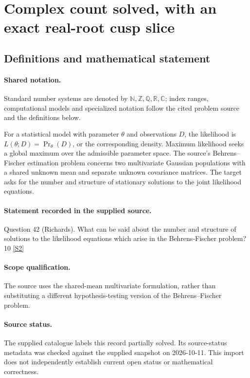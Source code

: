 \documentclass[11pt]{article}
\newcommand{\sref}[2]{\hyperlink{source:#1:#2}{[S#2]}}
\begin{document}
\section{Complex count solved, with an exact real-root cusp slice}\label{statement}

\subsection{Definitions and mathematical statement}

\paragraph{Shared notation.}Standard number systems are denoted by $\mathbb N,\mathbb Z,\mathbb Q,\mathbb R,\mathbb C$; index ranges, computational models and specialized notation follow the cited problem source and the definitions below.


For a statistical model with parameter $\theta$ and observations $D$, the likelihood is $L(\theta;D)=\Pr_\theta(D)$, or the corresponding density. Maximum likelihood seeks a global maximum over the admissible parameter space. The source's Behrens--Fischer estimation problem concerns two multivariate Gaussian populations with a shared unknown mean and separate unknown covariance matrices. The target asks for the number and structure of stationary solutions to the joint likelihood equations.
\paragraph{Statement recorded in the supplied source.}
Question 42 (Richards). What can be said about the number and structure of solutions to the likelihood equations which arise in the Behrens-Fischer problem? 10 \sref{statement}{2}
\paragraph{Scope qualification.}
The source uses the shared-mean multivariate formulation, rather than substituting a different hypothesis-testing version of the Behrens--Fischer problem.
\paragraph{Source status.}
The supplied catalogue labels this record partially solved. Its source-status metadata was checked against the supplied snapshot on 2026-10-11. This import does not independently establish current open status or mathematical correctness.
\end{document}

